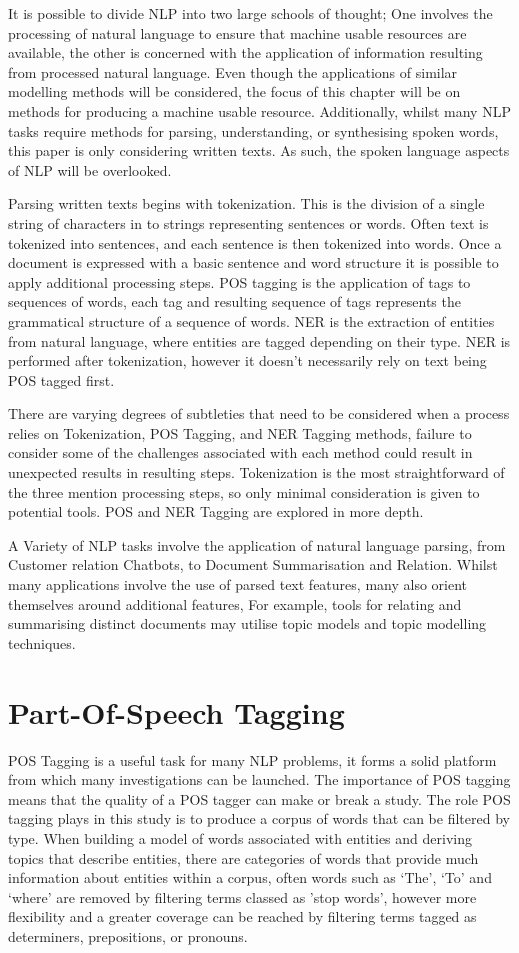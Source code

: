 \documentclass[10pt]{report}
\begin{document}
It is possible to divide NLP into two large schools of thought; One involves the processing of natural language to ensure that machine usable resources are available, the other is concerned with the application of information resulting from processed natural language. Even though the applications of similar modelling methods will be considered, the focus of this chapter will be on methods for producing a machine usable resource. Additionally, whilst many NLP tasks require methods for parsing, understanding, or synthesising spoken words, this paper is only considering written texts. As such, the spoken language aspects of NLP will be overlooked.

Parsing written texts begins with tokenization. This is the division of a single string of characters in to strings representing sentences or words. Often text is tokenized into sentences, and each sentence is then tokenized into words. Once a document is expressed with a basic sentence and word structure it is possible to apply additional processing steps. POS tagging is the application of tags to sequences of words, each tag and resulting sequence of tags represents the grammatical structure of a sequence of words. NER is the extraction of entities from natural language, where entities are tagged depending on their type. NER is performed after tokenization, however it doesn’t necessarily rely on text being POS tagged first.

There are varying degrees of subtleties that need to be considered when a process relies on Tokenization, POS Tagging, and NER Tagging methods, failure to consider some of the challenges associated with each method could result in unexpected results in resulting steps. Tokenization is the most straightforward of the three mention processing steps, so only minimal consideration is given to potential tools. POS and NER Tagging are explored in more depth.

A Variety of NLP tasks involve the application of natural language parsing, from Customer relation Chatbots, to Document Summarisation and Relation. Whilst many applications involve the use of parsed text features, many also orient themselves around additional features, For example, tools for relating and summarising distinct documents may utilise topic models and topic modelling techniques.


\section{Part-Of-Speech Tagging}
POS Tagging is a useful task for many NLP problems, it forms a solid platform from which many investigations can be launched. The importance of POS tagging means that the quality of a POS tagger can make or break a study. The role POS tagging plays in this study is to produce a corpus of words that can be filtered by type. When building a model of words associated with entities and deriving topics that describe entities, there are categories of words that provide much information about entities within a corpus, often words such as ‘The’, ‘To’ and ‘where’ are removed by filtering terms classed as 'stop words', however more flexibility and a greater coverage can be reached by filtering terms tagged as determiners, prepositions, or pronouns.
\end{document}
